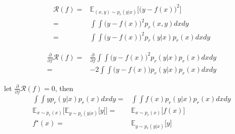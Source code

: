 \documentclass[../main.tex]{subfiles}
\begin{document}
\begin{align*}
    \mathcal{R}(f)
    = & \mathbb{E}_{(x,y) \sim p_r(y|x)}
        \big[ \big( y -f(x) \big)^2 \big] \\
    = & \int \int \big( y - f(x) \big)^2
        p_r(x,y)dxdy \\
    = & \int \int \big( y - f(x) \big)^2
        p_r(y|x) p_r(x) dxdy
\end{align*}

\begin{align*}
    \frac{\partial}{\partial f}\mathcal{R}(f)
    = & \frac{\partial}{\partial f}
        \int \int \big( y - f(x) \big)^2
        p_r(y|x) p_r(x) dxdy \\
    = & -2 \int \int \big( y - f(x) \big)
        p_r(y|x) p_r(x) dxdy
\end{align*}

let
$\frac{\partial}{\partial f}\mathcal{R}(f) = 0$,
then
\begin{align*}
    \int \int y p_r(y|x) p_r(x) dxdy
    = & \int \int f(x) p_r(y|x)p_r(x)dxdy \\
    \mathbb{E}_{x \sim p_r(x)} \big[
        \mathbb{E}_{y \sim p_r(y|x)} \big[
        y \big] \big]
    = & \mathbb{E}_{x \sim p_r(x)}
        \big[ f(x) \big] \\
    f^\star(x)
    = & \mathbb{E}_{y \sim p_r(y|x)}\big[ y \big]
\end{align*}
\end{document}
